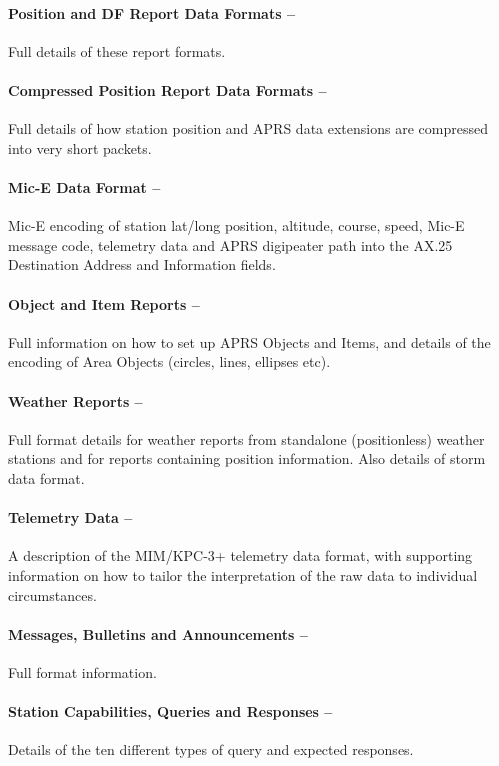 \documentclass{scrreprt}[letter]
\begin{document}
\paragraph{Position and DF Report Data Formats --}Full details of these report
formats.

\paragraph{Compressed Position Report Data Formats --}Full details of how station
position and APRS data extensions are compressed into very short packets.

\paragraph{Mic-E Data Format --}Mic-E encoding of station lat/long position, altitude,
course, speed, Mic-E message code, telemetry data and APRS digipeater
path into the AX.25 Destination Address and Information fields.

\paragraph{Object and Item Reports --}Full information on how to set up APRS
Objects and Items, and details of the encoding of Area Objects (circles, lines,
ellipses etc).

\paragraph{Weather Reports --}Full format details for weather reports from
standalone (positionless) weather stations and for reports containing
position information. Also details of storm data format.

\paragraph{Telemetry Data --}A description of the MIM/KPC-3+ telemetry data
format, with supporting information on how to tailor the interpretation of the
raw data to individual circumstances.

\paragraph{Messages, Bulletins and Announcements --}Full format information.

\paragraph{Station Capabilities, Queries and Responses --}Details of the ten different
types of query and expected responses.
\end{document}
